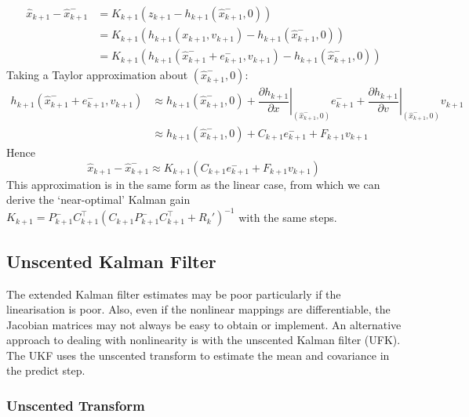 \documentclass[11pt]{report} %
\begin{document}
\begin{align}
\hat{x}_{k + 1} - \hat{x}_{k + 1}^{-} &= K_{k + 1}\left(z_{k + 1} - h_{k + 1}\left(\hat{x}_{k + 1}^{-}, 0\right)\right) \\
&= K_{k + 1}\left(h_{k + 1}\left(x_{k + 1}, v_{k + 1}\right) - h_{k + 1}\left(\hat{x}_{k + 1}^{-}, 0\right)\right) \\
&= K_{k + 1}\left(h_{k + 1}\left(\hat{x}_{k + 1}^{-} + e_{k + 1}^{-}, v_{k + 1}\right) - h_{k + 1}\left(\hat{x}_{k + 1}^{-}, 0\right)\right)
\end{align}
Taking a Taylor approximation about $\left(\hat{x}_{k + 1}^{-}, 0\right)$:
\begin{align}
h_{k + 1}\left(\hat{x}_{k + 1}^{-} + e_{k + 1}^{-}, v_{k + 1}\right) &\approx h_{k + 1}\left(\hat{x}_{k + 1}^{-}, 0\right) + \left.\dfrac{\partial h_{k + 1}}{\partial x}\right|_{\left(\hat{x}_{k + 1}^{-},  0\right)}e_{k + 1}^{-} + \left.\dfrac{\partial h_{k + 1}}{\partial v}\right|_{\left(\hat{x}_{k + 1}^{-},  0\right)}v_{k + 1} \\
&\approx h_{k + 1}\left(\hat{x}_{k + 1}^{-}, 0\right) + C_{k + 1}e_{k + 1}^{-} + F_{k + 1}v_{k + 1}
\end{align}
Hence
\begin{equation}
\hat{x}_{k + 1} - \hat{x}_{k + 1}^{-} \approx K_{k + 1}\left(C_{k + 1}e_{k + 1}^{-} + F_{k + 1}v_{k + 1}\right)
\end{equation}
This approximation is in the same form as the linear case, from which we can derive the `near-optimal' Kalman gain $K_{k + 1} = P_{k + 1}^{-}C_{k + 1}^{\top}\left(C_{k + 1}P_{k + 1}^{-}C_{k + 1}^{\top} + R_{k}'\right)^{-1}$ with the same steps.

\subsection{Unscented Kalman Filter}

The extended Kalman filter estimates may be poor particularly if the linearisation is poor. Also, even if the nonlinear mappings are differentiable, the Jacobian matrices may not always be easy to obtain or implement. An alternative approach to dealing with nonlinearity is with the unscented Kalman filter (UFK). The UKF uses the unscented transform to estimate the mean and covariance in the predict step.

\subsubsection{Unscented Transform \cite{Julier1996}}
\end{document}
